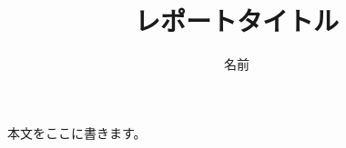 \documentclass[titlepage,a4paper]{jsarticle}
\title{レポートタイトル}
\author{名前}
\begin{document}
\maketitle

本文をここに書きます。
\end{document}
